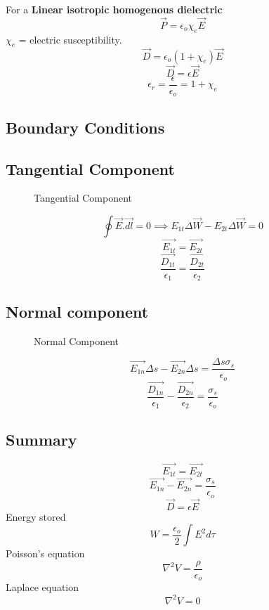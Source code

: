 For a \textbf{Linear isotropic homogenous dielectric} 
\[
    \vec{P} = \epsilon_{o} \chi_{e} \vec{E}
\]
\(\chi_{e} \) = electric susceptibility.
\[
    \vec{D} = \epsilon_{o} (1+\chi_{e})\vec{E}
\]
\[
    \vec{D} = \epsilon \vec{E}
\]
\[
    \epsilon_{r} = \frac{\epsilon}{\epsilon_{o}} = 1+\chi_{e} 
\]
\subsection*{Boundary Conditions}

\subsection*{Tangential Component}
\begin{figure}[H]
    \centering
    \caption{Tangential Component}
    \label{fig:boundaryconditions}
\end{figure}
\[
    \oint \vec{E}.\vec{dl} = 0 \implies E_{1t} \Delta\vec{W} - E_{2t}\Delta\vec{W} = 0
\]
\[
    \vec{E_{1t}} = \vec{E_{2t}}
\]
\[
    \frac{\vec{D_{1t}}}{\epsilon_1}=\frac{\vec{D_{2t}}}{\epsilon_2}
\]
\subsection*{Normal component}
\begin{figure}[H]
    \centering
    \caption{Normal Component}
    \label{fig:normalcomp}
\end{figure}
\[
    \vec{E_{1n} }\Delta s - \vec{E_{2n}  }\Delta s = \frac{\Delta s \sigma_s}{\epsilon_{o} }
\]
\[
\frac{\vec{D_{1n}}}{\epsilon _1}-\frac{\vec{D_{2n}}}{\epsilon _2} = \frac{\sigma_s}{\epsilon_{o} }
\]
\subsection*{Summary}
\[
    \vec{E_{1t}} = \vec{E_{2t}}
\]
\[
    \vec{E_{1n} } - \vec{E_{2n}  } = \frac{\sigma_s}{\epsilon_{o} }
\]
\[
    \vec{D} = \epsilon \vec{E}
\]
Energy stored
\[
    W = \frac{\epsilon_o}{2}\int E^2 d\tau
\]
Poisson's equation
\[
    \nabla^2 V = \frac{\rho}{\epsilon _o}
\]
Laplace equation
\[
    \nabla^2 V = 0 
\]
